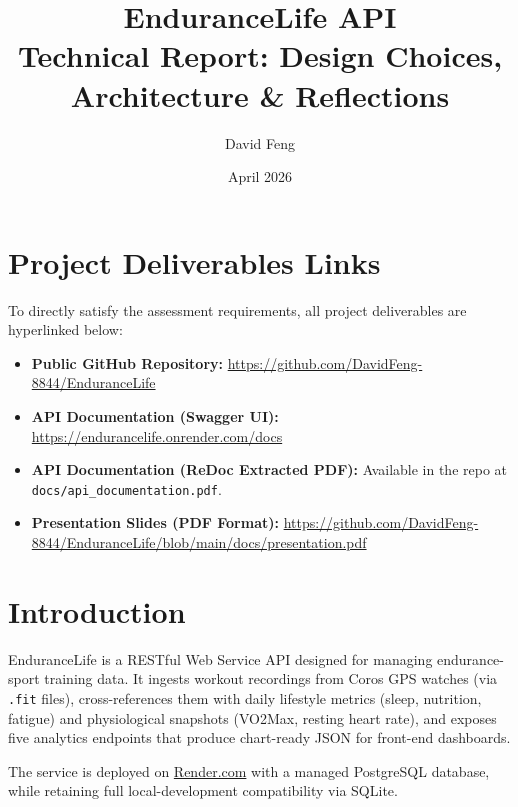 \documentclass[10pt,a4paper]{article}
\title{%
  \textbf{EnduranceLife API} \\[0.3em]
  \large Technical Report: Design Choices, Architecture \& Reflections
}
\author{David Feng}
\date{April 2026}
\begin{document}
\maketitle
\thispagestyle{fancy}

\section*{Project Deliverables Links}
To directly satisfy the assessment requirements, all project deliverables are hyperlinked below:

\begin{itemize}[leftmargin=1.5em]
    \item \textbf{Public GitHub Repository:} \url{https://github.com/DavidFeng-8844/EnduranceLife}
    \item \textbf{API Documentation (Swagger UI):} \url{https://endurancelife.onrender.com/docs}
    \item \textbf{API Documentation (ReDoc Extracted PDF):} Available in the repo at \texttt{docs/api\_documentation.pdf}.
    \item \textbf{Presentation Slides (PDF Format):} \url{https://github.com/DavidFeng-8844/EnduranceLife/blob/main/docs/presentation.pdf}
\end{itemize}

\section{Introduction}

EnduranceLife is a RESTful Web Service API designed for managing endurance-sport training data. It ingests workout recordings from Coros GPS watches (via \texttt{.fit} files), cross-references them with daily lifestyle metrics (sleep, nutrition, fatigue) and physiological snapshots (VO2Max, resting heart rate), and exposes five analytics endpoints that produce chart-ready JSON for front-end dashboards.

The service is deployed on \href{https://endurancelife.onrender.com}{Render.com} with a managed PostgreSQL database, while retaining full local-development compatibility via SQLite.

\end{document}
